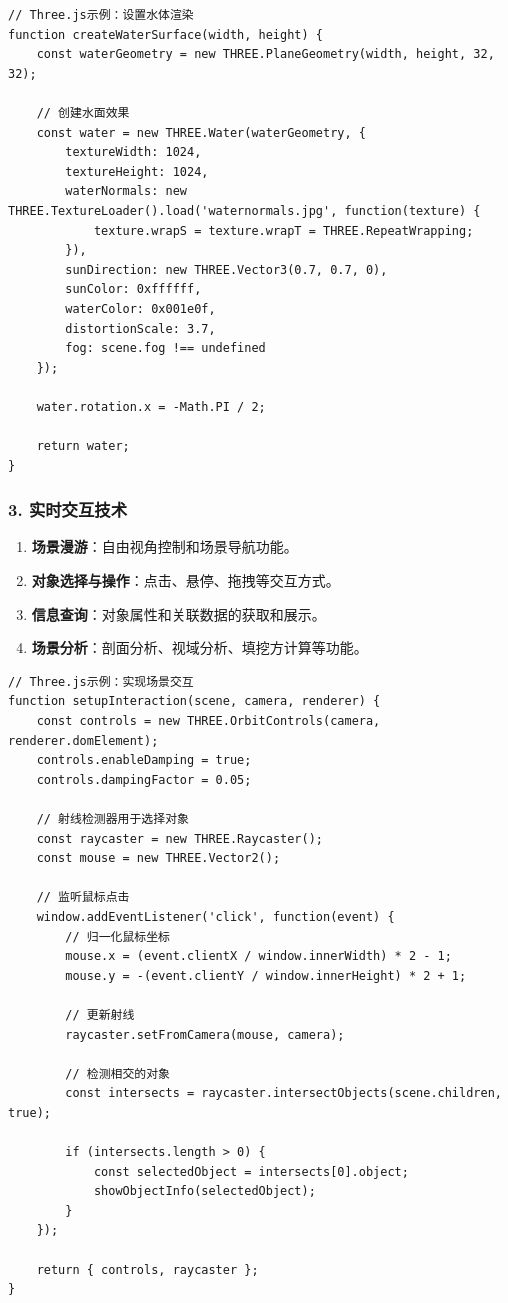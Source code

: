 \begin{lstlisting}
// Three.js示例：设置水体渲染
function createWaterSurface(width, height) {
    const waterGeometry = new THREE.PlaneGeometry(width, height, 32, 32);
    
    // 创建水面效果
    const water = new THREE.Water(waterGeometry, {
        textureWidth: 1024,
        textureHeight: 1024,
        waterNormals: new THREE.TextureLoader().load('waternormals.jpg', function(texture) {
            texture.wrapS = texture.wrapT = THREE.RepeatWrapping;
        }),
        sunDirection: new THREE.Vector3(0.7, 0.7, 0),
        sunColor: 0xffffff,
        waterColor: 0x001e0f,
        distortionScale: 3.7,
        fog: scene.fog !== undefined
    });
    
    water.rotation.x = -Math.PI / 2;
    
    return water;
}
\end{lstlisting}

\subsubsection{3.
实时交互技术}\label{ux5b9eux65f6ux4ea4ux4e92ux6280ux672f}

\begin{enumerate}
\def\labelenumi{\arabic{enumi}.}
\tightlist
\item
  \textbf{场景漫游}：自由视角控制和场景导航功能。
\item
  \textbf{对象选择与操作}：点击、悬停、拖拽等交互方式。
\item
  \textbf{信息查询}：对象属性和关联数据的获取和展示。
\item
  \textbf{场景分析}：剖面分析、视域分析、填挖方计算等功能。
\end{enumerate}

\begin{lstlisting}
// Three.js示例：实现场景交互
function setupInteraction(scene, camera, renderer) {
    const controls = new THREE.OrbitControls(camera, renderer.domElement);
    controls.enableDamping = true;
    controls.dampingFactor = 0.05;
    
    // 射线检测器用于选择对象
    const raycaster = new THREE.Raycaster();
    const mouse = new THREE.Vector2();
    
    // 监听鼠标点击
    window.addEventListener('click', function(event) {
        // 归一化鼠标坐标
        mouse.x = (event.clientX / window.innerWidth) * 2 - 1;
        mouse.y = -(event.clientY / window.innerHeight) * 2 + 1;
        
        // 更新射线
        raycaster.setFromCamera(mouse, camera);
        
        // 检测相交的对象
        const intersects = raycaster.intersectObjects(scene.children, true);
        
        if (intersects.length > 0) {
            const selectedObject = intersects[0].object;
            showObjectInfo(selectedObject);
        }
    });
    
    return { controls, raycaster };
}
\end{lstlisting}

